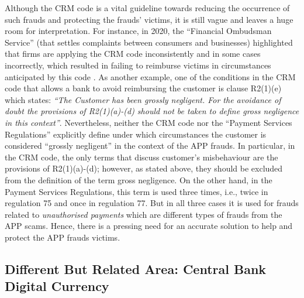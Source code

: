 Although the CRM code is a vital guideline  towards reducing the occurrence of such frauds and protecting  the frauds' victims, it is still  vague and leaves a huge room for interpretation. For instance, in 2020, the ``Financial Ombudsman Service'' (that settles complaints between consumers and businesses)  highlighted that firms  are applying the CRM code inconsistently and in some cases incorrectly, which resulted in failing to reimburse victims in circumstances anticipated by this code \cite{Financial-Ombudsman-Service-response}.  As another example, one of the conditions in the CRM code that allows a bank to avoid reimbursing the customer is clause R2(1)(e) which states: \textit{``The Customer has been grossly negligent. For the avoidance of doubt the provisions of R2(1)(a)-(d) should not be taken to define gross negligence in this context''}.  Nevertheless, neither the CRM code  nor the ``Payment Services Regulations'' \cite{Regulations}   explicitly define under which circumstances the customer is considered ``grossly negligent'' in the context of the APP frauds. In particular, in the CRM code, the only terms that discuss customer's misbehaviour are  the provisions of R2(1)(a)-(d); however, as stated above, they should be excluded from the definition of the term gross negligence. On the  other hand,  in the Payment Services Regulations, this term is used three times, i.e.,  twice in regulation 75 and once in regulation 77. But in all  three cases it is used for frauds related to \emph{unauthorised payments} which are  different types of frauds from the APP scams. Hence, there is a pressing need for an accurate solution to help and protect the APP frauds victims. 

\subsection{Different But Related Area: Central Bank Digital Currency}


